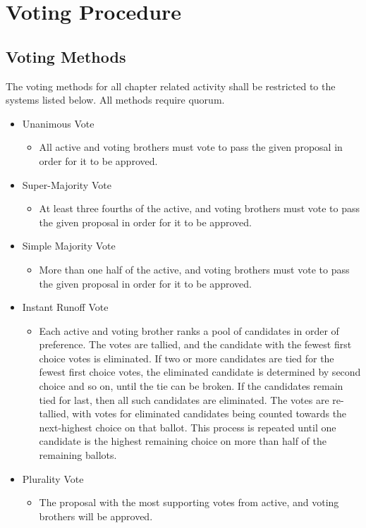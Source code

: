 \chapter{Voting Procedure}
\label{cha:voting-procedure}

\section{Voting Methods}
\label{sec:voting-methods}

The voting methods for all chapter related activity shall be restricted to the
systems listed below.
All methods require quorum.

\begin{itemize}
	\item Unanimous Vote
		\begin{itemize}
			\item All active and voting brothers must vote to pass the given
				proposal in order for it to be approved.
		\end{itemize}
	\item Super-Majority Vote
		\begin{itemize}
			\item At least three fourths of the active, and voting brothers must
				vote to pass the given proposal in order for it to be approved.
		\end{itemize}
	\item Simple Majority Vote
		\begin{itemize}
			\item More than one half of the active, and voting brothers must
				vote to pass the given proposal in order for it to be approved.
		\end{itemize} \item Instant Runoff Vote \begin{itemize} \item Each
				active and voting brother ranks a pool of candidates in order of
				preference.
				The votes are tallied, and the candidate with the fewest first
				choice votes is eliminated.
				If two or more candidates are tied for the fewest first choice
				votes, the eliminated candidate is determined by second choice
				and so on, until the tie can be broken.
				If the candidates remain tied for last, then all such candidates
				are eliminated.
				The votes are re-tallied, with votes for eliminated candidates
				being counted towards the next-highest choice on that ballot.
				This process is repeated until one candidate is the highest
				remaining choice on more than half of the remaining ballots.
		\end{itemize}
	\item Plurality Vote
		\begin{itemize}
			\item The proposal with the most supporting votes from active, and
				voting brothers will be approved.
		\end{itemize}
\end{itemize}

